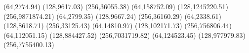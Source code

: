{(64,2774.94)    (128,9617.03)     (256,36055.38)}
{(64,158752.09)  (128,1245220.51)  (256,9871874.21)}
{(64,2799.35)    (128,9667.24)     (256,36160.29)}
{(64,2338.61)    (128,8618.71)     (256,33125.43)}
{(64,14810.97)   (128,102171.73)  (256,756806.44)}
{(64,112051.15)  (128,884427.52)  (256,7031719.82)}
{(64,124523.45)  (128,977979.83)  (256,7755400.13)}